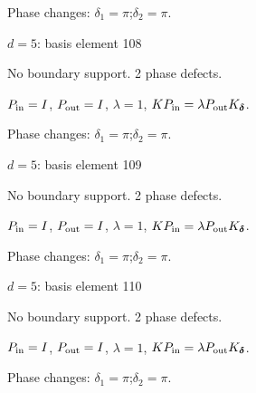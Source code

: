 \par\smallskip\begin{minipage}{.98\linewidth}\small Phase changes: $\delta_{1}=\pi$;\quad $\delta_{2}=\pi$.\end{minipage}
\vfill
{\footnotesize\texttt{}}
\newpage
{}
{\Large $d=5$: basis element 108}\par
No boundary support. 2 phase defects.
\begin{center}
\end{center}
\vspace{-1mm}
$P_{\rm in}=I$, \quad $P_{\rm out}=I$, \quad $\lambda=1$, \qquad $K P_{\rm in}=\lambda P_{\rm out}K_{\boldsymbol\delta}$.
\par\smallskip\begin{minipage}{.98\linewidth}\small Phase changes: $\delta_{1}=\pi$;\quad $\delta_{2}=\pi$.\end{minipage}
\vfill
{\footnotesize\texttt{}}
\newpage
{}
{\Large $d=5$: basis element 109}\par
No boundary support. 2 phase defects.
\begin{center}
\end{center}
\vspace{-1mm}
$P_{\rm in}=I$, \quad $P_{\rm out}=I$, \quad $\lambda=1$, \qquad $K P_{\rm in}=\lambda P_{\rm out}K_{\boldsymbol\delta}$.
\par\smallskip\begin{minipage}{.98\linewidth}\small Phase changes: $\delta_{1}=\pi$;\quad $\delta_{2}=\pi$.\end{minipage}
\vfill
{\footnotesize\texttt{}}
\newpage
{}
{\Large $d=5$: basis element 110}\par
No boundary support. 2 phase defects.
\begin{center}
\end{center}
\vspace{-1mm}
$P_{\rm in}=I$, \quad $P_{\rm out}=I$, \quad $\lambda=1$, \qquad $K P_{\rm in}=\lambda P_{\rm out}K_{\boldsymbol\delta}$.
\par\smallskip\begin{minipage}{.98\linewidth}\small Phase changes: $\delta_{1}=\pi$;\quad $\delta_{2}=\pi$.\end{minipage}
